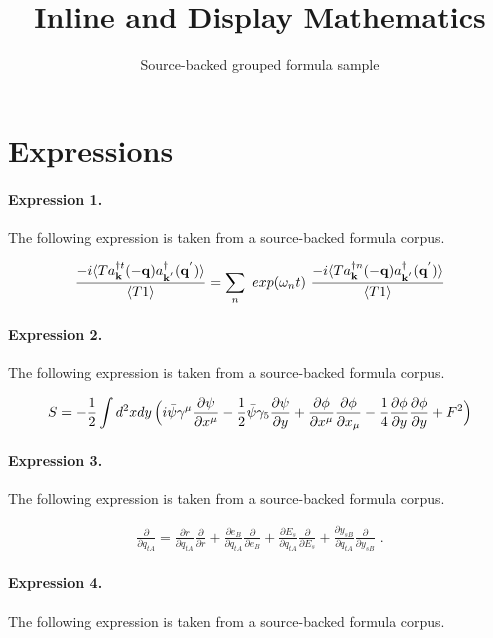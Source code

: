 \documentclass[11pt]{article}
\title{Inline and Display Mathematics}
\author{Source-backed grouped formula sample}
\date{}
\begin{document}
\maketitle
\section{Expressions}
\paragraph{Expression 1.} The following expression is taken from a source-backed formula corpus.

\begin{align*}\frac{ -i\langle T a^{\dagger t}_{ {\bf{k}} }(-{\bf{q}})a^{\dagger}_{ {\bf{k}}^{'} }({\bf{q}}^{'}) \rangle }{\langle T 1 \rangle} = \sum_{n}\text{ }exp(\omega_{n}t)\text{ }\frac{ -i\langle T a^{\dagger n}_{ {\bf{k}} }(-{\bf{q}})a^{\dagger}_{ {\bf{k}}^{'} }({\bf{q}}^{'}) \rangle }{\langle T 1 \rangle}\end{align*}

\paragraph{Expression 2.} The following expression is taken from a source-backed formula corpus.

\begin{align*}S=-\frac{1}{2}\int d^2xdy\,\Bigl(i\bar\psi\gamma^\mu\frac{\partial\psi}{\partial x^\mu}-\frac{1}{2}\bar\psi\gamma_5\frac{\partial\psi}{\partial y}+\frac{\partial\phi}{\partial x^\mu}\frac{\partial\phi}{\partial x_\mu}-\frac{1}{4}\frac{\partial\phi}{\partial y}\frac{\partial\phi}{\partial y}+F^2\Bigr)\end{align*}

\paragraph{Expression 3.} The following expression is taken from a source-backed formula corpus.

\begin{align*}\frac{\partial}{\partial q_{tA}}=\frac{\partial r}{\partial q_{tA}}\frac{\partial}{\partial r}+\frac{\partial e_B}{\partial q_{tA}}\frac{\partial}{\partial e_B}+\frac{\partial E_s}{\partial q_{tA}}\frac{\partial}{\partial E_s}+\frac{\partial y_{sB}}{\partial q_{tA}}\frac{\partial}{\partial y_{sB}}\;.\end{align*}

\paragraph{Expression 4.} The following expression is taken from a source-backed formula corpus.
\end{document}
